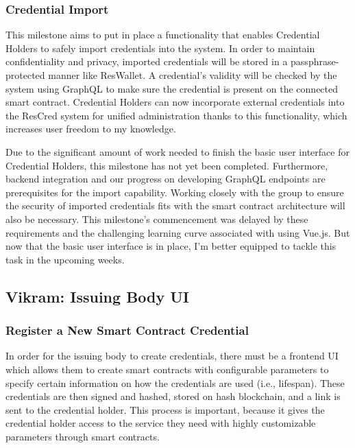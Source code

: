 \subsubsection{Credential Import}

This milestone aims to put in place a functionality that enables Credential Holders to safely import credentials into the system. In order to maintain confidentiality and privacy, imported credentials will be stored in a passphrase-protected manner like ResWallet. A credential's validity will be checked by the system using GraphQL to make sure the credential is present on the connected smart contract. Credential Holders can now incorporate external credentials into the ResCred system for unified administration thanks to this functionality, which increases user freedom to my knowledge.

Due to the significant amount of work needed to finish the basic user interface for Credential Holders, this milestone has not yet been completed. Furthermore, backend integration and our progress on developing GraphQL endpoints are prerequisites for the import capability. Working closely with the group to ensure the security of imported credentials fits with the smart contract architecture will also be necessary. This milestone's commencement was delayed by these requirements and the challenging learning curve associated with using Vue.js. But now that the basic user interface is in place, I'm better equipped to tackle this task in the upcoming weeks.

\subsection{Vikram: Issuing Body UI}
\subsubsection{Register a New Smart Contract Credential}

In order for the issuing body to create credentials, there must be a frontend UI which allows them to create smart contracts with configurable parameters to specify certain information on how the credentials are used (i.e., lifespan). These credentials are then signed and hashed, stored on hash blockchain, and a link is sent to the credential holder. This process is important, because it gives the credential holder access to the service they need with highly customizable parameters through smart contracts.

